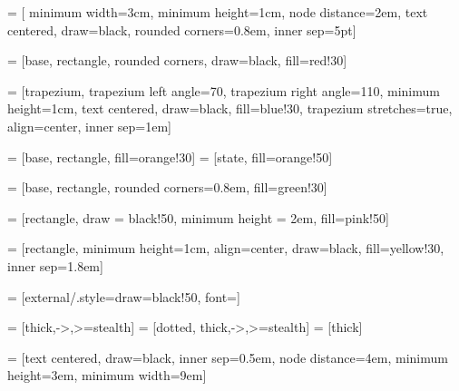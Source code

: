 \usepackage{tikz}
\usepackage{xparse}
\usetikzlibrary{positioning, fit, backgrounds, shapes, arrows.meta}


 = [
    minimum width=3cm,
    minimum height=1cm,
    node distance=2em,
    text centered,
    draw=black,
    rounded corners=0.8em,
    inner sep=5pt]

 = [base, rectangle, rounded corners, draw=black, fill=red!30]

 = [trapezium, trapezium left angle=70, trapezium right angle=110,
 minimum height=1cm, text centered, draw=black, fill=blue!30, trapezium stretches=true,
 align=center, inner sep=1em]

 = [base, rectangle, fill=orange!30]
 = [state, fill=orange!50]

 = [base, rectangle, rounded corners=0.8em, fill=green!30]

 = [rectangle, draw = black!50, minimum height = 2em, fill=pink!50]

 = [rectangle, minimum height=1cm, align=center, draw=black, fill=yellow!30, inner sep=1.8em]

 = [external/.style={draw=black!50}, font={\fontsize{13pt}{12}\selectfont}]

 = [thick,->,>=stealth]
 = [dotted, thick,->,>=stealth]
 = [thick]

\NewDocumentCommand{}
\newcommand\insertitem[1]{\item #1}

\NewDocumentCommand{}

\newcommand{\shortarrowlength}{3.1em}

 = [text centered, draw=black, inner sep=0.5em, node
distance=4em, minimum height=3em, minimum width=9em]


